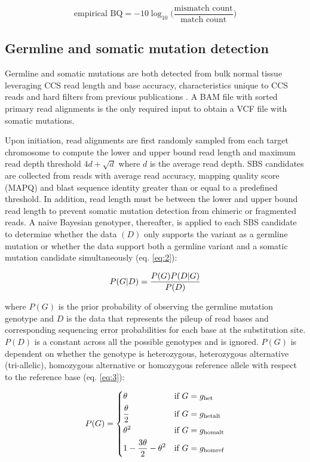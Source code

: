 \begin{equation} \label{eq:1}
\text{empirical BQ} = -10\log_{10} \Big( \frac{\text{mismatch count}}{\text{match count}} \Big)
\end{equation}

\subsection{Germline and somatic mutation detection}

Germline and somatic mutations are both detected from bulk normal tissue leveraging CCS read length and base accuracy, characteristics unique to CCS reads and hard filters from previous publications \cite{DePristo2011-vf, Kim2018-qi}. A BAM file with sorted primary read alignments is the only required input to obtain a VCF file with somatic mutations. 

Upon initiation, read alignments are first randomly sampled from each target chromosome to compute the lower and upper bound read length and maximum read depth threshold $4d + \sqrt{d}$ where $d$ is the average read depth. SBS candidates are collected from reads with average read accuracy, mapping quality score (MAPQ) and blast sequence identity greater than or equal to a predefined threshold. In addition, read length must be between the lower and upper bound read length to prevent somatic mutation detection from chimeric or fragmented reads. A naive Bayesian genotyper, thereafter, is applied to each SBS candidate to determine whether the data $(D)$ only supports the variant as a germline mutation or whether the data support both a germline variant and a somatic mutation candidate simultaneously (eq. \ref{eq:2}):

\begin{equation} \label{eq:2}
P(G|D) = \frac{P(G)P(D|G)}{P(D)} \smallskip
\end{equation}

where $P(G)$ is the prior probability of observing the germline mutation genotype and $D$ is the data that represents the pileup of read bases and corresponding sequencing error probabilities for each base at the substitution site. $P(D)$ is a constant across all the possible genotypes and is ignored. $P(G)$ is dependent on whether the genotype is heterozygous, heterozygous alternative (tri-allelic), homozygous alternative or homozygous reference allele with respect to the reference base (eq. \ref{eq:3}):

\begin{equation} \label{eq:3}
 P(G)= 
 	\begin{dcases}
    	\theta & \text{if } G = g_{\text{het}} \\
	    \frac{\theta}{2} & \text{if } G = g_{\text{hetalt}} \\
		\theta^{2} & \text{if } G = g_{\text{homalt}} \\
		1 - \frac{3\theta}{2} - \theta^{2} & \text{if } G = g_{\text{homref}} \\
	\end{dcases} \smallskip
\end{equation}

